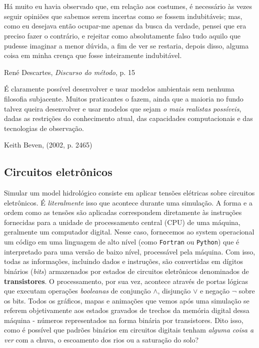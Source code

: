 \documentclass[./main.tex]{subfiles}
\begin{document}
\chapter{\chapEpis} \label{chap:episteme}

\setlength{\parskip}{0mm}

\epigraph{\small{Há muito eu havia observado que, em relação aos costumes, é necessário às vezes seguir opiniões que sabemos serem incertas como se fossem indubitáveis; mas, como eu desejava então ocupar-me apenas da busca da verdade, pensei que era preciso fazer o contrário, e rejeitar como absolutamente falso tudo aquilo que pudesse imaginar a menor dúvida, a fim de ver se restaria, depois disso, alguma coisa em minha crença que fosse inteiramente indubitável.}}{René Descartes, \textit{Discurso do método}, p. 15 \cite{descartes2008discurso}}

\epigraph{\small{É claramente possível desenvolver e usar modelos ambientais sem nenhuma filosofia subjacente. Muitos praticantes o fazem, ainda que a maioria no fundo talvez queira desenvolver e usar modelos que sejam \textit{o mais realistas possíveis}, dadas as restrições do conhecimento atual, das capacidades computacionais e das tecnologias de observação.}}{Keith Beven, (2002, p. 2465) \cite{Beven2002a}}

\setlength{\parskip}{\myparskip}

\section{Circuitos eletrônicos}\label{sec:epis:intro}

\par Simular um \gls{model} hidrológico consiste em aplicar tensões elétricas sobre circuitos eletrônicos. É \textit{literalmente} isso que acontece durante uma simulação. A forma e a ordem como as tensões são aplicadas correspondem diretamente às instruções fornecidas para a unidade de processamento central (CPU) de uma máquina, geralmente um computador digital. Nesse caso, fornecemos ao \gls{system} operacional um código em uma linguagem de alto nível (como \texttt{Fortran} ou \texttt{Python}) que é interpretado para uma versão de baixo nível, processável pela máquina. Com isso, todas as informações, incluindo dados e instruções, são convertidas em dígitos binários (\textit{bits}) armazenados por estados de circuitos eletrônicos denominados de \textbf{transistores}. O processamento, por sua vez, acontece através de portas lógicas que executam operações \textit{booleanas} de conjunção $\land$, disjunção $\lor$ e negação $\neg$ sobre os bits. Todos os gráficos, mapas e animações que vemos após uma simulação se referem objetivamente aos estados gravados de trechos da memória digital dessa máquina - números representados na forma binária por transistores. Dito isso, como é possível que padrões binários em circuitos digitais tenham \textit{alguma coisa a ver} com a chuva, o escoamento dos rios ou a saturação do solo?
\end{document}

